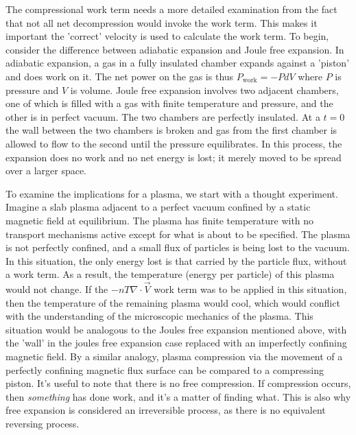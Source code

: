\begin{refsection}
The compressional work term needs a more detailed examination from the fact that not all net decompression would invoke the work term. This makes it important the 'correct' velocity is used to calculate the work term. To begin, consider the difference between adiabatic expansion and Joule free expansion. In adiabatic expansion, a gas in a fully insulated chamber expands against a 'piston' and does work on it. The net power on the gas is thus $P_{\text{work}} = - PdV$ where $P$ is pressure and $V$ is volume. Joule free expansion involves two adjacent chambers, one of which is filled with a gas with finite temperature and pressure, and the other is in perfect vacuum. The two chambers are perfectly insulated. At a $t=0$ the wall between the two chambers is broken and gas from the first chamber is allowed to flow to the second until the pressure equilibrates. In this process, the expansion does no work and no net energy is lost; it merely moved to be spread over a larger space. 

To examine the implications for a plasma, we start with a thought experiment. Imagine a slab plasma adjacent to a perfect vacuum confined by a static magnetic field at equilibrium. The plasma has finite temperature with no transport mechanisms active except for what is about to be specified. The plasma is not perfectly confined, and a small flux of particles is being lost to the vacuum. In this situation, the only energy lost is that carried by the particle flux, without a work term. As a result, the temperature (energy per particle) of this plasma would not change. If the $- nT\nabla\cdot\vec{V}$ work term was to be applied in this situation, then the temperature of the remaining plasma would cool, which would conflict with the understanding of the microscopic mechanics of the plasma. This situation would be analogous to the Joules free expansion mentioned above, with the 'wall' in the joules free expansion case replaced with an imperfectly confining magnetic field. By a similar analogy, plasma compression via the movement of a perfectly confining magnetic flux surface can be compared to a compressing piston. It's useful to note that there is no free compression. If compression occurs, then \emph{something} has done work, and it's a matter of finding what. This is also why free expansion is considered an irreversible process, as there is no equivalent reversing process.


\end{refsection}
